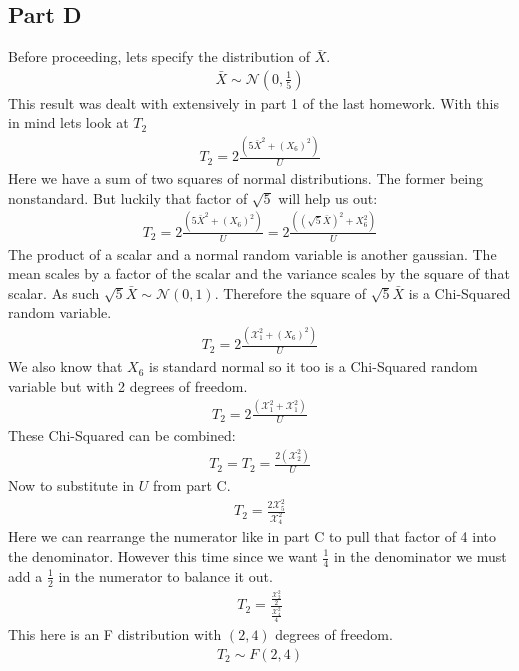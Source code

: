 \documentclass{article}
\begin{document}
\subsection*{Part D}
Before proceeding, lets specify the distribution of $\bar{X}$.
\begin{align*}
\bar{X} \sim \mathcal{N}(0,\frac{1}{5})
\end{align*}
This result was dealt with extensively in part 1 of the last homework. With this in mind lets look at $T_2$
\begin{align*}
T_2 = 2\frac{(5\bar{X}^2+(X_6)^2)}{U}
\end{align*}
Here we have a sum of two squares of normal distributions. The former being nonstandard. But luckily that factor of $\sqrt{5}$ will help us out:
\begin{align*}
T_2 = 2\frac{(5\bar{X}^2+(X_6)^2)}{U} = 2\frac{((\sqrt{5}\bar{X})^2+X_6^2)}{U}
\end{align*}
The product of a scalar and a normal random variable is another gaussian. The mean scales by a factor of the scalar and the variance scales by the square of that scalar. As such $\sqrt{5}\bar{X} \sim \mathcal{N}(0,1)$. Therefore the square of $\sqrt{5}\bar{X}$ is a Chi-Squared random variable.
\begin{align*}
T_2 = 2\frac{(\mathcal{X}^2_1+(X_6)^2)}{U}
\end{align*}
We also know that $X_6$ is standard normal so it too is a Chi-Squared random variable but with 2 degrees of freedom.
\begin{align*}
T_2 = 2\frac{(\mathcal{X}^2_1+\mathcal{X}^2_1)}{U}
\end{align*}
These Chi-Squared can be combined:
\begin{align*}
T_2 = T_2 = \frac{2(\mathcal{X}^2_2)}{U}
\end{align*}
Now to substitute in $U$ from part C.
\begin{align*}
T_2 = \frac{2\mathcal{X}^2_5}{\mathcal{X}^2_4}
\end{align*}
Here we can rearrange the numerator like in part C to pull that factor of 4 into the denominator. However this time since we want $\tfrac{1}{4}$ in the denominator we must add a $\tfrac{1}{2}$ in the numerator to balance it out.
\begin{align*}
T_2 = \frac{\tfrac{\mathcal{X}^2_2}{2}}{\tfrac{\mathcal{X}^2_4}{4}}
\end{align*}
This here is an F distribution with $(2,4)$ degrees of freedom.
\begin{align*}
\boxed{T_2 \sim F(2,4)}
\end{align*}
\clearpage
\end{document}
